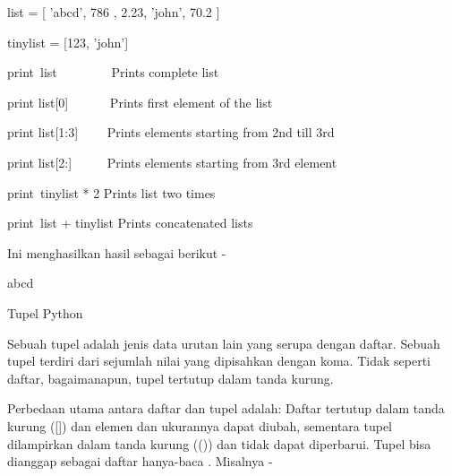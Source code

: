 \vspace{12pt}
\vspace{12pt}
\noindent 
list = [ 'abcd', 786 , 2.23, 'john', 70.2 ] \par
\noindent 
tinylist = [123, 'john'] \par
\vspace{12pt}
\noindent 
print~list~~~~~~~~   Prints complete list \par
\noindent 
print list[0]~~~~~~  Prints first element of the list \par
\noindent 
print list[1:3]~~~~  Prints elements starting from 2nd till 3rd  \par
\noindent 
print list[2:]~~~~~  Prints elements starting from 3rd element \par
\noindent 
print~tinylist * 2   Prints list two times \par
\noindent 
print~list + tinylist   Prints concatenated lists \par
\vspace{12pt}
\noindent 
Ini menghasilkan hasil sebagai berikut - \par
\vspace{12pt}
 \par
\noindent 
abcd \par
\noindent 
[786, 2.23] \par
\noindent 
[2.23, 'john', 70.200000000000003] \par
{} \par
{} \par
\vspace{12pt}
\noindent 
Tupel Python \par
\vspace{12pt}
\noindent 
Sebuah tupel adalah jenis data urutan lain yang serupa dengan daftar. $  $Sebuah tupel terdiri dari sejumlah nilai yang dipisahkan dengan koma. $  $Tidak seperti daftar, bagaimanapun, tupel tertutup dalam tanda kurung. \par
\vspace{12pt}
\noindent 
Perbedaan utama antara daftar dan tupel adalah: Daftar tertutup dalam tanda kurung ([]) dan elemen dan ukurannya dapat diubah, sementara tupel dilampirkan dalam tanda kurung (()) dan tidak dapat diperbarui. $  $Tupel bisa dianggap sebagai $  $daftar $  $hanya-baca $  $. $  $Misalnya - \par
\vspace{12pt}
